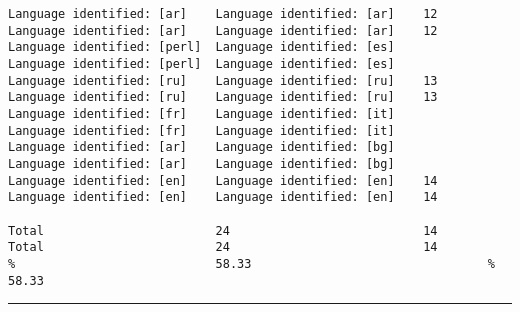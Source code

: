\begin{verbatim}
Language identified: [ar]    Language identified: [ar]    12       Language identified: [ar]    Language identified: [ar]    12
Language identified: [perl]  Language identified: [es]             Language identified: [perl]  Language identified: [es]
Language identified: [ru]    Language identified: [ru]    13       Language identified: [ru]    Language identified: [ru]    13
Language identified: [fr]    Language identified: [it]             Language identified: [fr]    Language identified: [it]
Language identified: [ar]    Language identified: [bg]             Language identified: [ar]    Language identified: [bg]
Language identified: [en]    Language identified: [en]    14       Language identified: [en]    Language identified: [en]    14

Total                        24                           14       Total                        24                           14
%                            58.33                                 %                            58.33
\end{verbatim}
\vskip4pt\hrule

\clearpage

